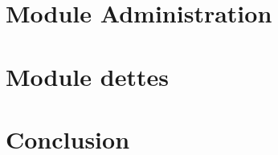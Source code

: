 \documentclass[twoside,UTF8]{EPURapport}
\begin{document}
\chapter{Module Administration}

\chapter{Module dettes}

\chapter{Conclusion}

\annexes
\end{document}
